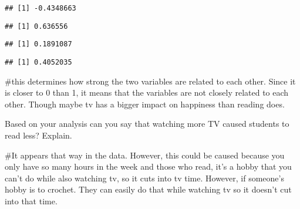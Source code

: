 \documentclass[
]{article}
\newenvironment{Shaded}{\begin{snugshade}}{\end{snugshade}}
\newcommand{\DecValTok}[1]{\textcolor[rgb]{0.00,0.00,0.81}{#1}}
\newcommand{\FunctionTok}[1]{\textcolor[rgb]{0.00,0.00,0.00}{#1}}
\newcommand{\NormalTok}[1]{#1}
\newcommand{\SpecialCharTok}[1]{\textcolor[rgb]{0.00,0.00,0.00}{#1}}
\begin{document}
\begin{verbatim}
## [1] -0.4348663
\end{verbatim}

\begin{Shaded}
\end{Shaded}

\begin{verbatim}
## [1] 0.636556
\end{verbatim}

\begin{Shaded}
\end{Shaded}

\begin{verbatim}
## [1] 0.1891087
\end{verbatim}

\begin{Shaded}
\end{Shaded}

\begin{verbatim}
## [1] 0.4052035
\end{verbatim}

\#this determines how strong the two variables are related to each
other. Since it is closer to 0 than 1, it means that the variables are
not closely related to each other. Though maybe tv has a bigger impact
on happiness than reading does.

Based on your analysis can you say that watching more TV caused students
to read less? Explain.

\#It appears that way in the data. However, this could be caused because
you only have so many hours in the week and those who read, it's a hobby
that you can't do while also watching tv, so it cuts into tv time.
However, if someone's hobby is to crochet. They can easily do that while
watching tv so it doesn't cut into that time.
\end{document}
